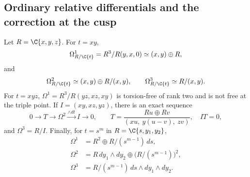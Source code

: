 \subsection{Ordinary relative differentials and the correction at the cusp}

\begin{proposition}\label{inv:A4.1}
Let $R=\C\{x,y,z\}$.  For $t=xy$,
\[
\Omega_{R/\C\{t\}}^1=R^3/R(y,x,0)
\simeq(x,y)\oplus R,
\]
and
\[
\Omega_{R/\C\{t\}}^2\simeq
(x,y)\oplus R/(x,y),\qquad
\Omega_{R/\C\{t\}}^3\simeq R/(x,y).
\]
For $t=xyz$,
$\Omega^1=R^3/R(yz,xz,xy)$ is torsion-free of rank two and is
not free at the triple point.  If $I=(xy,xz,yz)$, there is an exact
sequence
\[
0\to T\to\Omega^2\xrightarrow{\wedge dt} I\to0,
\qquad
T=\frac{R u\oplus R v}{(xu,\ y(u-v),\ zv)},
\quad IT=0,
\]
and $\Omega^3=R/I$.  Finally, for $t=s^m$ in
$R=\C\{s,y_1,y_2\}$,
\[
\begin{aligned}
\Omega^1&=R^2\oplus R/(s^{m-1})\,ds,\\
\Omega^2&=R\,dy_1\wedge dy_2
 \oplus\bigl(R/(s^{m-1})\bigr)^2,\\
\Omega^3&=R/(s^{m-1})\,ds\wedge dy_1\wedge dy_2.
\end{aligned}
\]
\end{proposition}

